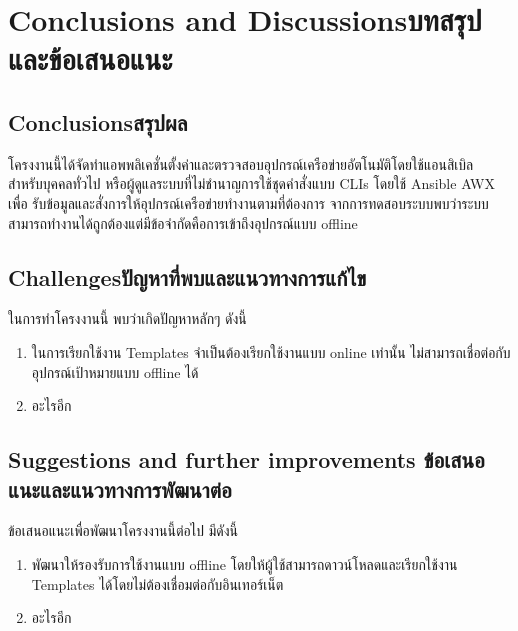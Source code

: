 \chapter{\ifenglish Conclusions and Discussions\else บทสรุปและข้อเสนอแนะ\fi}

\section{\ifenglish Conclusions\else สรุปผล\fi}

\hspace{0.5in}โครงงานนี้ได้จัดทำแอพพลิเคชั่นตั้งค่าและตรวจสอบอุปกรณ์เครือข่ายอัตโนมัติโดยใช้แอนสิเบิล
สำหรับบุคคลทั่วไป หรือผู้ดูแลระบบที่ไม่ชำนาญการใช้ชุดคำสั่งแบบ CLIs โดยใช้ Ansible AWX เพื่อ
รับข้อมูลและสั่งการให้อุปกรณ์เครือข่ายทำงานตามที่ต้องการ จากการทดสอบระบบพบว่าระบบ
สามารถทำงานได้ถูกต้องแต่มีข้อจำกัดคือการเข้าถึงอุปกรณ์แบบ offline

\section{\ifenglish Challenges\else ปัญหาที่พบและแนวทางการแก้ไข\fi}

\hspace{0.5in}ในการทำโครงงานนี้ พบว่าเกิดปัญหาหลักๆ ดังนี้
\begin{enumerate}
    \item ในการเรียกใช้งาน Templates จำเป็นต้องเรียกใช้งานแบบ online เท่านั้น ไม่สามารถเชื่อต่อกับอุปกรณ์เป้าหมายแบบ offline ได้
    \item อะไรอีก
  \end{enumerate}
\section{\ifenglish%
Suggestions and further improvements
\else%
ข้อเสนอแนะและแนวทางการพัฒนาต่อ
\fi
}

\hspace{0.5in}ข้อเสนอแนะเพื่อพัฒนาโครงงานนี้ต่อไป มีดังนี้
\begin{enumerate}
    \item พัฒนาให้รองรับการใช้งานแบบ offline โดยให้ผู้ใช้สามารถดาวน์โหลดและเรียกใช้งาน Templates ได้โดยไม่ต้องเชื่อมต่อกับอินเทอร์เน็ต
    \item อะไรอีก
  \end{enumerate}
